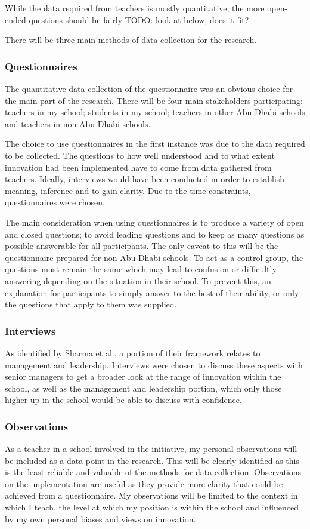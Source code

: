While the data required from teachers is mostly quantitative, the more open-ended questions should be fairly 
TODO: look at below, does it fit?

There will be three main methods of data collection for the research.

\subsubsection{Questionnaires}
The quantitative data collection of the questionnaire was an obvious choice for the main part of the research. There will be four main stakeholders participating: teachers in my school; students in my school; teachers in other Abu Dhabi schools and teachers in non-Abu Dhabi schools. 

The choice to use questionnaires in the first instance was due to the data required to be collected. The questions to how well understood and to what extent innovation had been implemented have to come from data gathered from teachers. Ideally, interviews would have been conducted in order to establish meaning, inference and to gain clarity. Due to the time constraints, questionnaires were chosen. 

The main consideration when using questionnaires is to produce a variety of open and closed questions; to avoid leading questions and to keep as many questions as possible answerable for all participants. The only caveat to this will be the questionnaire prepared for non-Abu Dhabi schools. To act as a control group, the questions must remain the same which may lead to confusion or difficultly answering depending on the situation in their school. To prevent this, an explanation for participants to simply answer to the best of their ability, or only the questions that apply to them was supplied.

\subsubsection{Interviews}

As identified by Sharma et al., a portion of their framework relates to management and leadership. Interviews were chosen to discuss these aspects with senior managers to get a broader look at the range of innovation within the school, as well as the management and leadership portion, which only those higher up in the school would be able to discuss with confidence.

\subsubsection{Observations}

As a teacher in a school involved in the initiative, my personal observations will be included as a data point in the research. This will be clearly identified as this is the least reliable and valuable of the methods for data collection. Observations on the implementation are useful as they provide more clarity that could be achieved from a questionnaire. My observations will be limited to the context in which I teach, the level at which my position is within the school and influenced by my own personal biases and views on innovation. 

